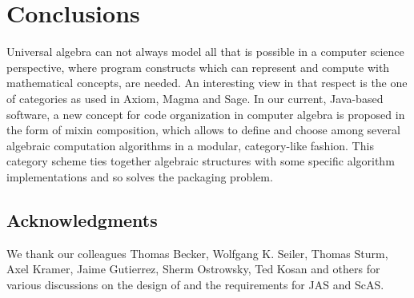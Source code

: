 \documentclass{llncs}
\begin{document}
\section{Conclusions} %

Universal algebra can not always model all that is possible in a computer
science perspective, where program constructs which can represent and compute
with mathematical concepts, are needed. An interesting view in that respect is
the one of categories as used in Axiom, Magma and Sage. In our current,
Java-based software, a new concept for code organization in computer algebra is
proposed in the form of mixin composition, which allows to define and choose
among several algebraic computation algorithms in a modular, category-like
fashion. This category scheme ties together algebraic structures with 
some specific algorithm implementations and so solves the packaging problem.

\subsection*{Acknowledgments} %

We thank our colleagues Thomas Becker, Wolfgang K. Seiler, Thomas
Sturm, Axel Kramer, Jaime Gutierrez, Sherm Ostrowsky, Ted Kosan and
others for various discussions on the design of and the requirements
for JAS and ScAS. 




\end{document}
